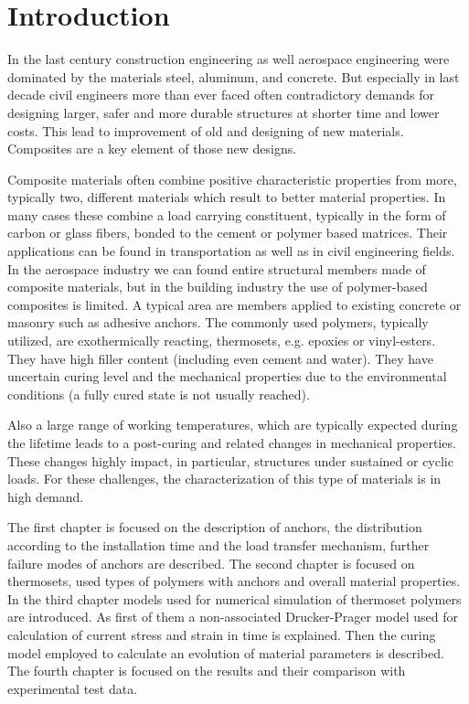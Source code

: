 \section*{Introduction}
\indent

In the last century construction engineering as well aerospace engineering  were dominated by the materials steel, aluminum, and concrete. But especially in last decade civil engineers more than ever faced often contradictory demands for designing larger, safer and more durable structures at shorter time and lower costs. This lead to improvement of old and designing of new materials. Composites are a key element of those new designs.

Composite materials often combine positive characteristic properties from more, typically two, different materials which result to better material properties. In many cases these combine a load carrying constituent, typically in the form of carbon or glass fibers, bonded to the cement or polymer based matrices. Their applications can be found in transportation as well as in civil engineering fields. In the aerospace industry we can found entire structural members made of composite materials, but in the building industry the use of polymer-based composites is limited. A typical area are members applied to existing concrete or masonry such as adhesive anchors. The commonly used polymers, typically utilized, are exothermically reacting, thermosets, e.g. epoxies or vinyl-esters. They have high filler content (including even cement and water). They have uncertain curing level and the mechanical properties due to the environmental conditions (a fully cured state is not usually reached).

Also a large range of working temperatures, which are typically expected during the lifetime leads to a post-curing and related changes in mechanical properties. These changes highly impact, in particular, structures under sustained or cyclic loads. For these challenges, the characterization of this type of materials is in high demand.  

The first chapter is focused on the description of anchors, the distribution according to the installation time and the load transfer mechanism, further failure modes of anchors are described. The second chapter is focused on thermosets, used types of polymers with anchors and overall material properties. In the third chapter models used for numerical simulation of thermoset polymers are introduced. As first of them a non-associated Drucker-Prager model used for calculation of current stress and strain in time is explained. Then the curing model employed to calculate an evolution of material parameters is described. The fourth chapter is focused on the results and their comparison with experimental test data.

